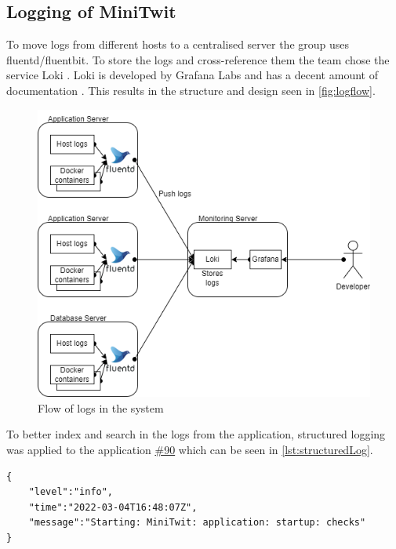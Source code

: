 \subsection{Logging of MiniTwit}\label{sec:logging}

To move logs from different hosts to a centralised server the group uses fluentd\cite{fluentd}/fluentbit\cite{fluentbit}. To store the logs and cross-reference them the team chose the service Loki \cite{grafana_loki}. Loki is developed by Grafana Labs and has a decent amount of documentation \cite{grafana_loki_docs}. This results in the structure and design seen in \autoref{fig:logflow}.

\begin{figure}[!ht]
    \centering
    \captionsetup{justification=centering,margin=1cm}
    \includegraphics[width=120mm]{images/logging/LogFlow.png}
    \caption{Flow of logs in the system}
    \label{fig:logflow}
\end{figure}

To better index and search in the logs from the application, structured logging was applied to the application \href{https://github.com/DevelOpsITU/MiniTwit/issues/90}{\#90} which can be seen in \autoref{lst:structuredLog}. 
\begin{lstlisting}[caption={Example log of the MiniTwit application},label={lst:structuredLog},captionpos=b]
{
    "level":"info",
    "time":"2022-03-04T16:48:07Z",
    "message":"Starting: MiniTwit: application: startup: checks"
}
\end{lstlisting}

